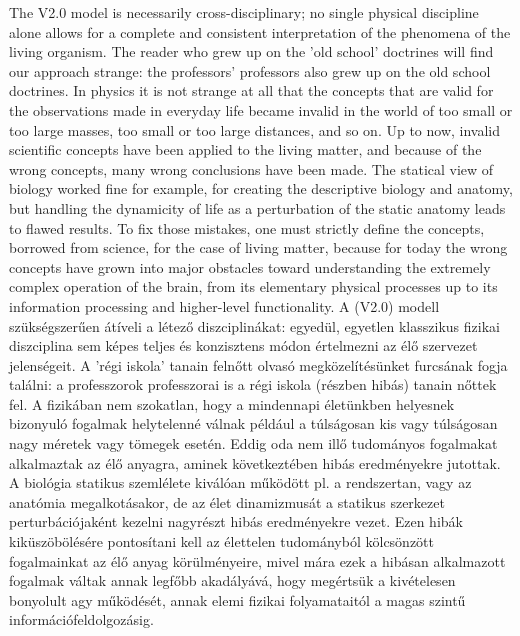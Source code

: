 \ifx\magyar\undefined
The V2.0 model is necessarily cross-disciplinary; no single physical discipline alone allows for a complete and consistent interpretation of the phenomena of the living organism.
The reader who grew up on the 'old school' doctrines will find our approach strange: the professors' professors also grew up on the old school doctrines.
 In physics it is not strange at all
that the concepts that are valid for the observations 
made in everyday life became invalid in the world
of too small or too large masses, too small or too large
distances, and so on. Up to now, invalid scientific concepts
have been applied to the living matter, and because of the wrong concepts, many wrong conclusions have been made. 
The statical view of biology worked fine for example,
for creating the descriptive biology and anatomy, but 
handling the dynamicity of life as a perturbation of 
the static anatomy leads to flawed results.
To fix those mistakes, one must strictly define the concepts,
borrowed from science, for the case of living matter, 
because for today the wrong concepts have grown into
major obstacles toward understanding the extremely complex
operation of the brain, from its elementary physical processes
up to its information processing and higher-level functionality.
\else
A (V2.0) modell szükségszerűen átíveli a létező diszciplinákat: egyedül, egyetlen klasszikus fizikai diszciplina sem képes teljes és konzisztens módon értelmezni az élő szervezet jelenségeit. 
A 'régi iskola' tanain felnőtt olvasó megközelítésünket 
furcsának fogja találni: a professzorok professzorai 
is a régi iskola (részben hibás) tanain nőttek fel.
A fizikában nem szokatlan, hogy a mindennapi életünkben
helyesnek bizonyuló fogalmak helytelenné válnak például a
túlságosan kis vagy túlságosan nagy méretek vagy tömegek esetén.
Eddig oda nem illő tudományos fogalmakat alkalmaztak 
az élő anyagra, aminek következtében hibás eredményekre jutottak.
A biológia statikus szemlélete kiválóan működött pl. a rendszertan, vagy az anatómia megalkotásakor, 
de az élet dinamizmusát a statikus szerkezet 
perturbációjaként kezelni nagyrészt hibás eredményekre vezet. 
Ezen hibák kiküszöbölésére pontosítani kell az élettelen tudományból kölcsönzött fogalmainkat az élő anyag körülményeire, mivel mára ezek a hibásan alkalmazott fogalmak
váltak annak legfőbb akadályává, hogy megértsük a kivételesen
bonyolult agy működését, annak elemi fizikai folyamataitól
a magas szintű információfeldolgozásig.
\fi


\ifx\magyar\undefined


